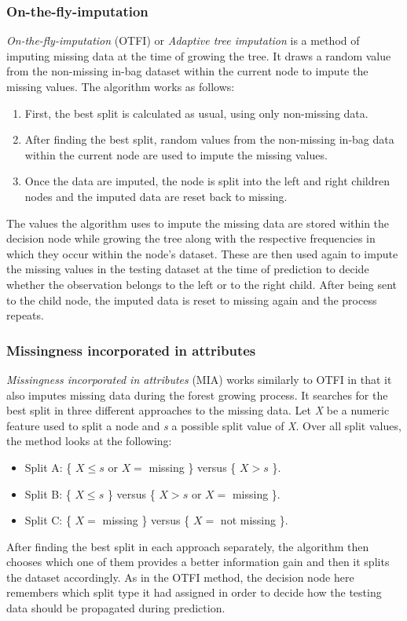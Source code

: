 \documentclass[11pt]{article}
\begin{document}
      \subsubsection{On-the-fly-imputation}
        {\it On-the-fly-imputation} (OTFI) or {\it Adaptive tree imputation} is a method of imputing missing data at the time of growing the tree. It draws a random value from the non-missing in-bag dataset within the current node to impute the missing values. The algorithm works as follows: 
        \begin{enumerate}
        \item First, the best split is calculated as usual, using only non-missing data.
        \item After finding the best split, random values from the non-missing in-bag data within the current node are used to impute the missing values.
        \item Once the data are imputed, the node is split into the left and right children nodes and the imputed data are reset back to missing.
        \end{enumerate}
        The values the algorithm uses to impute the missing data are stored within the decision node while growing the tree along with the respective frequencies in which they occur within the node's dataset. These are then used again to impute the missing values in the testing dataset at the time of prediction to decide whether the observation belongs to the left or to the right child. After being sent to the child node, the imputed data is reset to missing again and the process repeats.
      \subsubsection{Missingness incorporated in attributes}
        {\it Missingness incorporated in attributes} (MIA) works similarly to OTFI in that it also imputes missing data during the forest growing process. It searches for the best split in three different approaches to the missing data. Let {\it X} be a numeric feature used to split a node and {\it s} a possible split value of {\it X}. Over all split values, the method looks at the following:
        \begin{itemize}
        \item Split A: \{ $X \leq s$ or $X =$ missing \} versus \{ $X > s$ \}.
        \item Split B: \{ $X \leq s$ \} versus \{ $X > s$ or $X =$ missing \}.
        \item Split C: \{ $X =$ missing \} versus \{ $X =$ not missing \}.
        \end{itemize}
        After finding the best split in each approach separately, the algorithm then chooses which one of them provides a better information gain and then it splits the dataset accordingly. As in the OTFI method, the decision node here remembers which split type it had assigned in order to decide how the testing data should be propagated during prediction.
\end{document}

